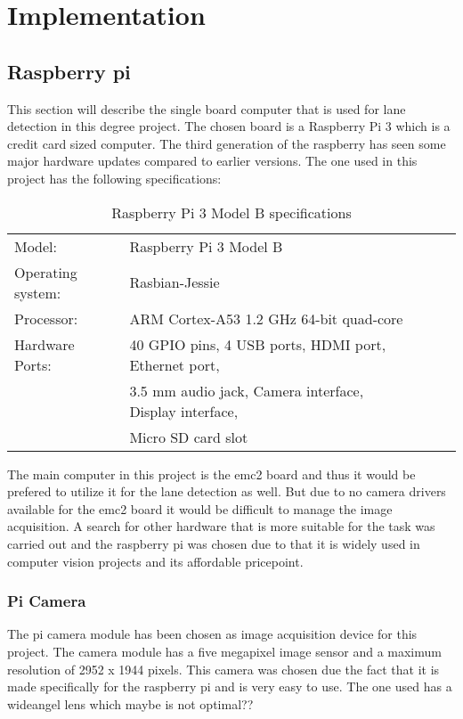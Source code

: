 \chapter{Implementation}


\section{Raspberry pi}
This section will describe the single board computer that is used for lane detection in this degree project. The chosen board is a Raspberry Pi 3 which is a credit card sized computer. The third generation of the raspberry has seen some major hardware updates compared to earlier versions. The one used in this project has the following specifications:



\begin{table}[H]
\centering
\caption{Raspberry Pi 3 Model B specifications}
\label{my-label}
\begin{tabular}{lllll}
 Model:	&Raspberry Pi 3 Model B  \\
 Operating system:	&Rasbian-Jessie  \\
 Processor:	&ARM Cortex-A53 1.2 GHz 64-bit quad-core  \\
 Hardware Ports:	&40 GPIO pins, 4 USB ports, HDMI port, Ethernet port,\\  &3.5 mm audio jack, Camera interface, Display interface,\\  &Micro SD card slot
\end{tabular}
\end{table}



The main computer in this project is the emc2 board and thus it would be prefered to utilize it for the lane detection as well. But due to no camera drivers available for the emc2 board it would be difficult to manage the image acquisition. A search for other hardware that is more suitable for the task was carried out and the raspberry pi was chosen due to that it is widely used in computer vision projects and its affordable pricepoint.

\subsection{Pi Camera}
The pi camera module has been chosen as image acquisition device for this project. The camera module has a five megapixel image sensor and a maximum resolution of 2952 x 1944 pixels. This camera was chosen due the fact that it is made specifically for the raspberry pi and is very easy to use. The one used has a wideangel lens which maybe is not optimal??





